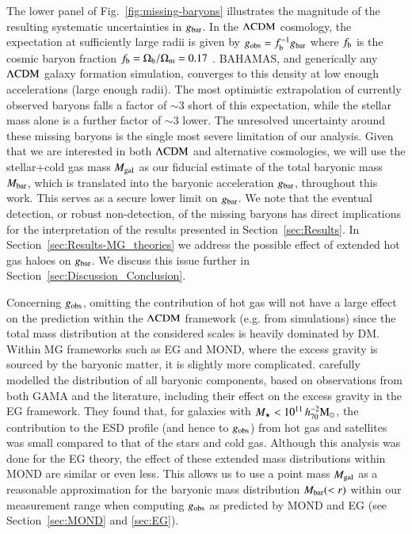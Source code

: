 \documentclass{aa}
\newcommand{\hmsun}{\,h_{70}^{-2} {\rm M_\odot}}
\renewcommand{\Upomega}{{\rm \Omega}}
\newcommand{\lcdm}{{\rm \Lambda CDM}}
\newcommand{\un}[1]{_{\rm #1}}
\begin{document}
The lower panel of Fig.~\ref{fig:missing-baryons} illustrates the magnitude of the resulting systematic uncertainties in $g_{\rm bar}$. In the $\lcdm$ cosmology, the expectation at sufficiently large radii is given by $g\un{obs}=f^{-1}\un{b} g\un{bar}$ where $f\un{b}$ is the cosmic baryon fraction $f\un{b} = \Upomega\un{b}/\Upomega\un{m} = 0.17$ \cite[]{hinshaw2013}. BAHAMAS, and generically any $\lcdm$ galaxy formation simulation, converges to this density at low enough accelerations (large enough radii). The most optimistic extrapolation of currently observed baryons falls a factor of $\sim 3$ short of this expectation, while the stellar mass alone is a further factor of $\sim 3$ lower. The unresolved uncertainty around these missing baryons is the single most severe limitation of our analysis. Given that we are interested in both $\lcdm$ and alternative cosmologies, we will use the stellar+cold gas mass $M\un{gal}$ as our fiducial estimate of the total baryonic mass $M\un{bar}$, which is translated into the baryonic acceleration $g\un{bar}$, throughout this work. This serves as a secure lower limit on $g\un{bar}$. We note that the eventual detection, or robust non-detection, of the missing baryons has direct implications for the interpretation of the results presented in Section~\ref{sec:Results}. In Section~\ref{sec:Results-MG_theories} we address the possible effect of extended hot gas haloes on $g\un{bar}$. We discuss this issue further in Section~\ref{sec:Discussion_Conclusion}.

Concerning $g\un{obs}$, omitting the contribution of hot gas will not have a large effect on the prediction within the $\lcdm$ framework (e.g. from simulations) since the total mass distribution at the considered scales is heavily dominated by DM. Within MG frameworks such as EG and MOND, where the excess gravity is sourced by the baryonic matter, it is slightly more complicated. \cite[][see section~2.2]{brouwer2017} carefully modelled the distribution of all baryonic components, based on observations from both GAMA and the literature, including their effect on the excess gravity in the EG framework. They found that, for galaxies with $M_\star<10^{11}\hmsun$, the contribution to the ESD profile (and hence to $g\un{obs}$) from hot gas and satellites was small compared to that of the stars and cold gas. Although this analysis was done for the EG theory, the effect of these extended mass distributions within MOND are similar or even less. This allows us to use a point mass $M\un{gal}$ as a reasonable approximation for the baryonic mass distribution $M\un{bar}(<r)$ within our measurement range when computing $g\un{obs}$ as predicted by MOND and EG (see Section~\ref{sec:MOND} and \ref{sec:EG}).
\end{document}

